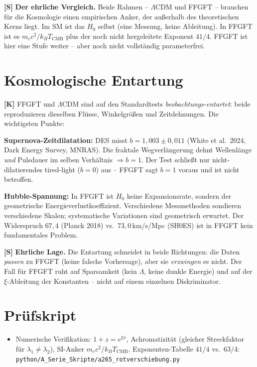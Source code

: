 \textbf{[S]} \textbf{Der ehrliche Vergleich.} Beide Rahmen -- $\Lambda$CDM und
FFGFT -- brauchen für die Kosmologie einen empirischen Anker, der außerhalb des
theoretischen Kerns liegt. Im SM ist das $H_0$ selbst (eine Messung, keine
Ableitung). In FFGFT ist es $m_ec^2/k_BT_\text{CMB}$ plus der noch nicht
hergeleitete Exponent $41/4$. FFGFT ist hier eine Stufe weiter -- aber noch nicht
vollständig parameterfrei.

\section{Kosmologische Entartung}

\textbf{[K]} FFGFT und $\Lambda$CDM sind auf den Standardtests
\emph{beobachtungs-entartet}: beide reproduzieren dieselben Flüsse, Winkelgrößen
und Zeitdehnungen. Die wichtigsten Punkte:

\textbf{Supernova-Zeitdilatation:} DES misst $b=1{,}003\pm0{,}011$ (White et al.\ 2024, Dark Energy Survey, MNRAS). Die fraktale
Wegverlängerung dehnt Wellenlänge \emph{und} Pulsdauer im selben Verhältnis
$\Rightarrow b=1$. Der Test schließt nur nicht-dilatierendes tired-light ($b=0$)
aus -- FFGFT sagt $b=1$ voraus und ist nicht betroffen.

\textbf{Hubble-Spannung:} In FFGFT ist $H_0$ keine Expansionsrate, sondern der
geometrische Energieverlustkoeffizient. Verschiedene Messmethoden sondieren
verschiedene Skalen; systematische Variationen sind geometrisch erwartet. Der
Widerspruch $67{,}4$ (Planck 2018) vs.\ $73{,}0\,$km/s/Mpc (SH0ES) ist in FFGFT kein fundamentales
Problem.

\textbf{[S]} \textbf{Ehrliche Lage.} Die Entartung schneidet in beide Richtungen:
die Daten \emph{passen} zu FFGFT (keine falsche Vorhersage), aber sie
\emph{erzwingen} es nicht. Der Fall für FFGFT ruht auf Sparsamkeit (kein $\Lambda$,
keine dunkle Energie) und auf der $\xi$-Ableitung der Konstanten -- nicht auf
einem einzelnen Diskriminator.

\section{Prüfskript}

\begin{itemize}[leftmargin=2em,itemsep=2pt,topsep=2pt]
  \item Numerische Verifikation: $1+z=e^{\xi x}$, Achromatizität (gleicher
    Streckfaktor für $\lambda_1\neq\lambda_2$), SI-Anker $m_ec^2/k_BT_\text{CMB}$,
    Exponenten-Tabelle $41/4$ vs.\ $63/4$:
    \texttt{python/A\_Serie\_Skripte/a265\_rotverschiebung.py}
\end{itemize}


